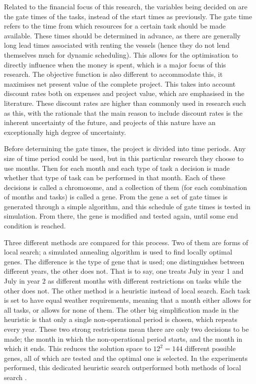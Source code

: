\documentclass[a4paper,12pt]{article}
\begin{document}
Related to the financial focus of this research, the variables being decided on are the gate times of the tasks, instead of the start times as previously. The gate time refers to the time from which resources for a certain task should be made available. These times should be determined in advance, as there are generally long lead times associated with renting the vessels (hence they do not lend themselves much for dynamic scheduling). This allows for the optimisation to directly influence when the money is spent, which is a major focus of this research. The objective function is also different to accommodate this, it maximises net present value of the complete project. This takes into account discount rates both on expenses and project value, which are emphasised in the literature. These discount rates are higher than commonly used in research such as this, with the rationale that the main reason to include discount rates is the inherent uncertainty of the future, and projects of this nature have an exceptionally high degree of uncertainty.

Before determining the gate times, the project is divided into time periods. Any size of time period could be used, but in this particular research they choose to use months. Then for each month and each type of task a decision is made whether that type of task can be performed in that month. Each of these decisions is called a chromosome, and a collection of them (for each combination of months and tasks) is called a gene. From the gene a set of gate times is generated through a simple algorithm, and this schedule of gate times is tested in simulation. From there, the gene is modified and tested again, until some end condition is reached. 

Three different methods are compared for this process. Two of them are forms of local search; a simulated annealing algorithm is used to find locally optimal genes. The difference is the type of gene that is used; one distinguishes between different years, the other does not. That is to say, one treats July in year 1 and July in year 2 as different months with different restrictions on tasks while the other does not. The other method is a heuristic instead of local search. Each task is set to have equal weather requirements, meaning that a month either allows for all tasks, or allows for none of them. The other big simplification made in the heuristic is that only a single non-operational period is chosen, which repeats every year. These two strong restrictions mean there are only two decisions to be made; the month in which the non-operational period starts, and the month in which it ends. This reduces the solution space to $12^2 = 144$ different possible genes, all of which are tested and the optimal one is selected. In the experiments performed, this dedicated heuristic search outperformed both methods of local search . 
\end{document}

